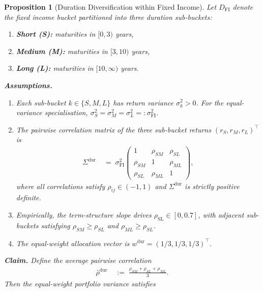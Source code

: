 \documentclass[12pt,openany]{book}
\newcommand{\bfw}{\mathbf{w}}
\newcommand{\calD}{\mathcal{D}}
\numberwithin{equation}{chapter}
\theoremstyle{plain}
\newtheorem{proposition}[theorem]{Proposition}
\theoremstyle{definition}
\theoremstyle{remark}
\def\calD{D}%
\def\mathcal#1{#1}%
\def\bfw{w}%
\begin{document}
\begin{proposition}[Duration Diversification within Fixed Income]
\label{prop:duration-div}
Let $\calD_{\mathrm{FI}}$ denote the fixed income bucket partitioned
into three duration sub-buckets:
\begin{enumerate}
  \item \textbf{Short (S):} maturities in $[0,3)$ years,
  \item \textbf{Medium (M):} maturities in $[3,10)$ years,
  \item \textbf{Long (L):} maturities in $[10,\infty)$ years.
\end{enumerate}
\noindent\textbf{Assumptions.}
\begin{enumerate}
  \item Each sub-bucket $k \in \{S,M,L\}$ has return variance
        $\sigma_k^2 > 0$.  For the equal-variance specialisation,
        $\sigma_S^2 = \sigma_M^2 = \sigma_L^2 =: \sigma_{\mathrm{FI}}^2$.
  \item The pairwise correlation matrix of the three sub-bucket
        returns $(r_S, r_M, r_L)^\top$ is
        \begin{align}
          \Sigma^{\mathrm{dur}}
          &\;=\; \sigma_{\mathrm{FI}}^2
            \begin{pmatrix}
              1              & \rho_{SM} & \rho_{SL} \\
              \rho_{SM}      & 1         & \rho_{ML} \\
              \rho_{SL}      & \rho_{ML} & 1
            \end{pmatrix},
          \label{eq:dur-cov-matrix}
        \end{align}
        where all correlations satisfy $\rho_{ij} \in (-1, 1)$ and
        $\Sigma^{\mathrm{dur}}$ is strictly positive definite.
  \item Empirically, the term-structure slope drives
        $\rho_{\mathrm{SL}} \in [0, 0.7]$, with adjacent
        sub-buckets satisfying
        $\rho_{SM} \geq \rho_{SL}$ and $\rho_{ML} \geq \rho_{SL}$.
  \item The equal-weight allocation vector is
        $\bfw^{\mathrm{dur}} = (1/3, 1/3, 1/3)^\top$.
\end{enumerate}
\noindent\textbf{Claim.}  Define the average pairwise correlation
\begin{align}
  \bar{\rho}^{\mathrm{dur}}
  &\;:=\; \frac{\rho_{SM} + \rho_{SL} + \rho_{ML}}{3}.
  \label{eq:dur-rho-bar}
\end{align}
Then the equal-weight portfolio variance satisfies

\end{proposition}
\end{document}
